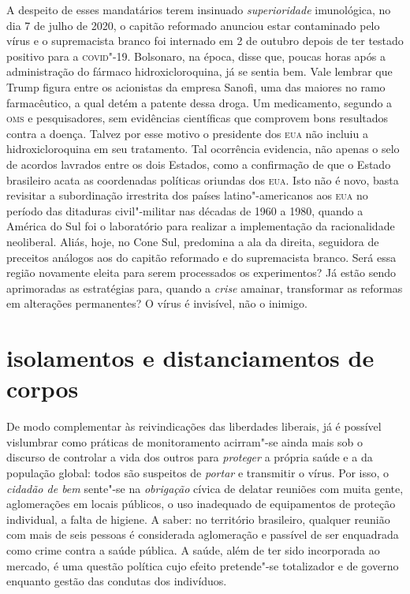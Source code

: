 A despeito de esses mandatários terem insinuado \emph{superioridade}
imunológica, no dia 7 de julho de 2020, o capitão reformado anunciou
estar contaminado pelo vírus e o supremacista branco foi internado em 2
de outubro depois de ter testado positivo para a \textsc{covid}"-19. Bolsonaro, na
época, disse que, poucas horas após a administração do fármaco
hidroxicloroquina, já se sentia bem. Vale lembrar que Trump figura entre
os acionistas da empresa Sanofi, uma das maiores no ramo farmacêutico, a
qual detém a patente dessa droga. Um medicamento, segundo a \textsc{oms} e
pesquisadores, sem evidências científicas que comprovem bons resultados
contra a doença. Talvez por esse motivo o presidente dos \textsc{eua} não incluiu
a hidroxicloroquina em seu tratamento. Tal ocorrência evidencia, não
apenas o selo de acordos lavrados entre os dois Estados, como a
confirmação de que o Estado brasileiro acata as coordenadas políticas
oriundas dos \textsc{eua}. Isto não é novo, basta revisitar a subordinação
irrestrita dos países latino"-americanos aos \textsc{eua} no período das ditaduras
civil"-militar nas décadas de 1960 a 1980, quando a América do Sul foi o
laboratório para realizar a implementação da racionalidade neoliberal.
Aliás, hoje, no Cone Sul, predomina a ala da direita, seguidora de
preceitos análogos aos do capitão reformado e do supremacista branco.
Será essa região novamente eleita para serem processados os
experimentos? Já estão sendo aprimoradas as estratégias para, quando a
\emph{crise} amainar, transformar as reformas em alterações permanentes?
O vírus é invisível, não o inimigo.

\section{isolamentos e distanciamentos de corpos}

De modo complementar às reivindicações das liberdades liberais, já é
possível vislumbrar como práticas de monitoramento acirram"-se ainda mais
sob o discurso de controlar a vida dos outros para \emph{proteger} a
própria saúde e a da população global: todos são suspeitos de
\emph{portar} e transmitir o vírus. Por isso, o \emph{cidadão de bem}
sente"-se na \emph{obrigação} cívica de delatar reuniões com muita gente,
aglomerações em locais públicos, o uso inadequado de equipamentos de
proteção individual, a falta de higiene. A saber: no território
brasileiro, qualquer reunião com mais de seis pessoas é considerada
aglomeração e passível de ser enquadrada como crime contra a saúde
pública. A saúde, além de ter sido incorporada ao mercado, é uma questão
política cujo efeito pretende"-se totalizador e de governo enquanto
gestão das condutas dos indivíduos.

